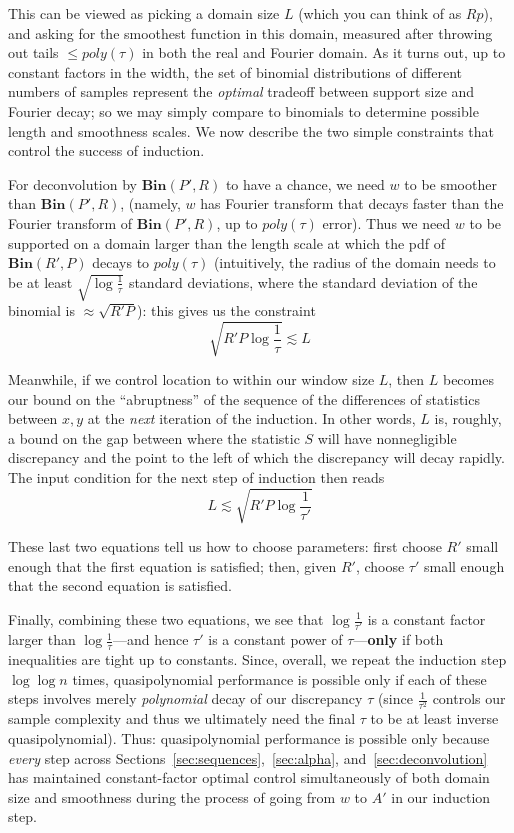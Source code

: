 \documentclass[11pt]{article}
\theoremstyle{plain}
\newcommand{\Bin}[2]{\textbf{Bin}(#1,#2)}
\begin{document}
This can be viewed as picking a domain size $L$ (which you can think of as $Rp$), and asking for the smoothest function in this domain, measured after throwing out tails $\leq poly(\tau)$ in both the real and Fourier domain. As it turns out, up to constant factors in the width, the set of binomial distributions of different numbers of samples represent the \emph{optimal} tradeoff between support size and Fourier decay; so we may simply compare to binomials to determine possible length and smoothness scales. We now describe the two simple constraints that control the success of induction.

For deconvolution by $\Bin{P'}{R}$ to have a chance, we need $w$ to be smoother than $\Bin{P'}{R}$, (namely, $w$ has Fourier transform that decays faster than the Fourier transform of $\Bin{P'}{R}$, up to $poly(\tau)$ error). Thus we need $w$ to be supported on a domain larger than the length scale at which the pdf of $\Bin{R'}{P}$ decays to $poly(\tau)$ (intuitively, the radius of the domain needs to be at least $\sqrt{\log\frac{1}{\tau}}$ standard deviations, where the standard deviation of the binomial is $\approx\sqrt{R'P}$): this gives us the constraint \[ \sqrt{R'P\log\frac{1}{\tau}}\lesssim L\]

Meanwhile, if we control location to within our window size $L$, then $L$ becomes our bound on the ``abruptness'' of the sequence of the differences of statistics between $x,y$ at the \emph{next} iteration of the induction. In other words, $L$ is, roughly, a bound on the gap between where the statistic $S$ will have nonnegligible discrepancy and the point to the left of which the discrepancy will decay rapidly. The input condition for the next step of induction then reads \[L\lesssim\sqrt{R'P \log\frac{1}{\tau'}}\]

These last two equations tell us how to choose parameters: first choose $R'$ small enough that the first equation is satisfied; then, given $R'$, choose $\tau'$ small enough that the second equation is satisfied.

Finally, combining these two equations, we see that $\log\frac{1}{\tau'}$ is a constant factor larger than $\log\frac{1}{\tau}$---and hence $\tau'$ is a constant power of $\tau$---\textbf{only} if both inequalities are tight up to constants. Since, overall, we repeat the induction step $\log\log n$ times, quasipolynomial performance is possible only if each of these steps involves merely \textit{polynomial} decay of our discrepancy $\tau$ (since $\frac{1}{\tau^2}$ controls our sample complexity and thus we ultimately need the final $\tau$ to be at least inverse quasipolynomial). Thus: quasipolynomial performance is possible only because \textit{every} step across Sections~\ref{sec:sequences},~\ref{sec:alpha}, and~\ref{sec:deconvolution} has maintained constant-factor optimal control simultaneously of both domain size and smoothness during the process of going from $w$ to $A'$ in our induction step.
\end{document}
